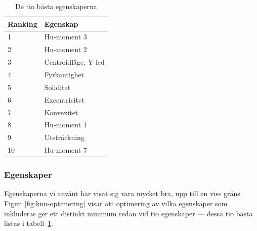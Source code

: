 \documentclass[../rapport_MVEX01-11-05]{subfiles}
\begin{document}
\begin{table}[tb]
	\centering
	\caption{De tio bästa egenskaperna}
	\label{tab:bestfeats}
	\begin{tabular}{ll}
		\toprule
		Ranking & Egenskap \\
		\midrule
		1 & Hu-moment 3 \\
		2 & Hu-moment 2 \\
		3 & Centroidläge, Y-led \\
		4 & Fyrkantighet \\
		5 & Soliditet \\
		6 & Excentricitet \\
		7 & Konvexitet \\
		8 & Hu-moment 1 \\
		9 & Utsträckning \\
		10 & Hu-moment 7 \\
		\bottomrule
	\end{tabular}
\end{table}

\subsubsection{Egenskaper}\label{sec:resultat_features}

Egenskaperna vi använt har visat sig vara mycket bra, upp till en viss gräns.
Figur~\ref{fig:knn-optimering} visar att optimering av vilka egenskaper som
inkluderas ger ett distinkt minimum redan vid tio egenskaper --- dessa tio
bästa listas i tabell~\ref{tab:bestfeats}.
\end{document}
